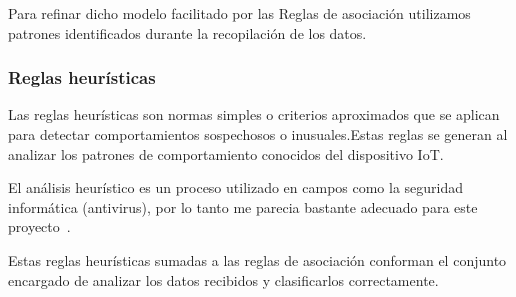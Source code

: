  Para refinar dicho modelo facilitado por las Reglas de asociación utilizamos patrones identificados durante la recopilación de los datos. 

\subsubsection{Reglas heurísticas}
Las reglas heurísticas son normas simples o criterios aproximados que se aplican para detectar comportamientos sospechosos o inusuales.Estas reglas se generan al analizar los patrones de comportamiento conocidos del dispositivo IoT.

El análisis heurístico es un proceso utilizado en campos como la seguridad informática (antivirus), por lo tanto me parecia bastante adecuado para este proyecto~\cite{Heu:Sec}.

Estas reglas heurísticas sumadas a las reglas de asociación conforman el conjunto encargado de analizar los datos recibidos y clasificarlos correctamente.












